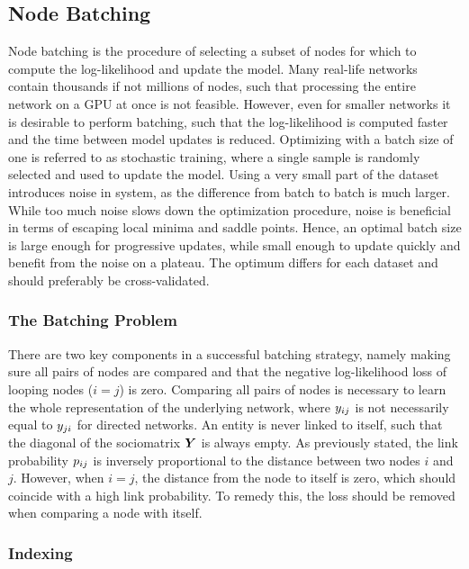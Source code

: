 \subsection{Node Batching}

    Node batching is the procedure of selecting a subset of nodes for which to compute the log-likelihood and update the model. Many real-life networks contain thousands if not millions of nodes, such that processing the entire network on a GPU at once is not feasible. However, even for smaller networks it is desirable to perform batching, such that the log-likelihood is computed faster and the time between model updates is reduced. Optimizing with a batch size of one is referred to as stochastic training, where a single sample is randomly selected and used to update the model. Using a very small part of the dataset introduces noise in system, as the difference from batch to batch is much larger. While too much noise slows down the optimization procedure, noise is beneficial in terms of escaping local minima and saddle points. Hence, an optimal batch size is large enough for progressive updates, while small enough to update quickly and benefit from the noise on a plateau. The optimum differs for each dataset and should preferably be cross-validated.
    
    \subsubsection{The Batching Problem}
    
        There are two key components in a successful batching strategy, namely making sure all pairs of nodes are compared and that the negative log-likelihood loss of looping nodes ($i=j$) is zero. 
        Comparing all pairs of nodes is necessary to learn the whole representation of the underlying network, where $\sub(y)$ is not necessarily equal to $\sub(y)(ji)$ for directed networks. 
        An entity is never linked to itself, such that the diagonal of the sociomatrix $\bm{Y}$ is always empty. As previously stated, the link probability $\sub(p)$ is inversely proportional to the distance between two nodes $i$ and $j$. However, when $i=j$, the distance from the node to itself is zero, which should coincide with a high link probability. To remedy this, the loss should be removed when comparing a node with itself.
        
    \subsubsection{Indexing}
    
